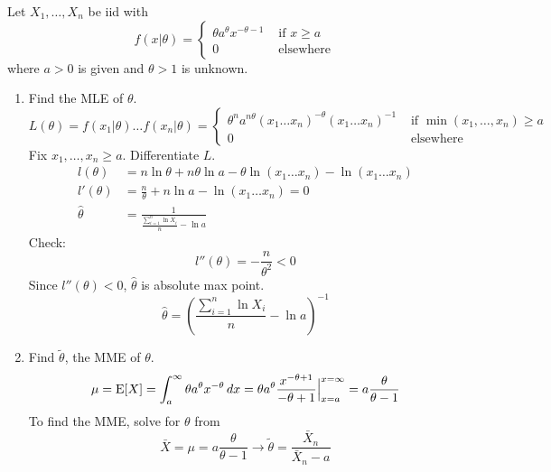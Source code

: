 \documentclass[12pt]{article}
\begin{document}
\begin{question} Let $X_1,\dots,X_n$ be iid with $$f(x|\theta) = \begin{cases} \theta a^\theta x^{-\theta - 1} &\text{ if } x \geq a \\ 0 &\text{ elsewhere} \end{cases} $$ 
where $a > 0$ is given and $\theta > 1$ is unknown. 
\begin{enumerate} 
\item Find the MLE of $\theta$. 
$$L(\theta) = f(x_1|\theta) \dots f(x_n |\theta) = \begin{cases} \theta^n a^{n\theta} (x_1 \hdots x_n)^{-\theta} (x_1 \hdots x_n)^{-1} &\text{ if } \min(x_1,\dots,x_n) \geq a \\ 0 &\text{ elsewhere } \end{cases} $$ 
Fix $x_1,\dots,x_n \geq a$. Differentiate $L$. $$ \begin{aligned} l(\theta) &= n\ln \theta + n\theta \ln a - \theta \ln(x_1 \hdots x_n) - \ln(x_1 \hdots x_n) \\ l'(\theta) &= \frac{n}{\theta} + n\ln a - \ln(x_1 \hdots x_n) = 0 \\ \hat{\theta} &= \frac{1}{\frac{\sum_{i=1}^n \ln X_i}{n} - \ln a} \end{aligned} $$
Check: $$ l''(\theta) = -\frac{n}{\theta^2} < 0 $$ Since $l''(\theta) < 0$, $\hat{\theta}$ is absolute max point. $$ \hat{\theta} = ( \frac{\sum_{i=1}^n \ln X_i}{n} - \ln a)^{-1} $$ 
\item Find $\tilde{\theta}$, the MME of $\theta$. 
$$ \mu = \mathrm{E}[ X ] = \int_a^\infty \theta a^\theta x^{-\theta} \, dx = \theta a^\theta \frac{x^{-\theta + 1}}{-\theta+1}\Big|_{x=a}^{x=\infty} = a\frac{\theta}{\theta-1} $$ 
To find the MME, solve for $\theta$ from $$ \bar{X} = \mu = a\frac{\theta}{\theta-1} \to \tilde{\theta} = \frac{\bar{X}_n}{\bar{X}_n -a} $$ 
\end{enumerate} 
\end{question} 
\end{document}
